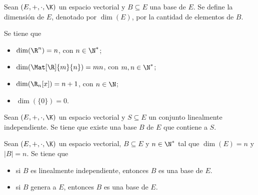 \documentclass[a4,11pt]{aleph-notas}
\begin{document}
\begin{defi}[Dimensión]
    Sean $(E,+,\cdot,\K)$ un espacio vectorial y $B\subseteq E$ una base de $E$. Se define la dimensión de $E$, denotado por $\dim(E)$, por la cantidad de elementos de $B$.
\end{defi}

\begin{teo}
    Se tiene que
    \begin{itemize}
    \item
        $\dim(\R^n)=n$, con $n\in \N^*$;
    \item
        $\dim(\Mat[\R]{m}{n})=mn$, con $m,n\in \N^*$;
    \item
        $\dim(\R_n[x])=n+1$, con $n\in \N$;
    \item
        $\dim(\{0\}) = 0$.
    \end{itemize}
\end{teo}


\begin{teo}
    Sean $(E,+,\cdot,\K)$ un espacio vectorial y $S\subseteq E$ un conjunto linealmente independiente. Se tiene que existe una base $B$ de $E$ que contiene a $S$.
\end{teo}


\begin{teo}
    Sean $(E,+,\cdot,\K)$ un espacio vectorial, $B\subseteq E$ y $n\in\N^*$ tal que $\dim(E)=n$ y $|B|=n$. Se tiene que
    \begin{itemize}
    \item
        si $B$ es linealmente independiente, entonces $B$ es una base de $E$.
    \item
        si $B$ genera a $E$, entonces $B$ es una base de $E$.
    \end{itemize}
\end{teo}
\end{document}
